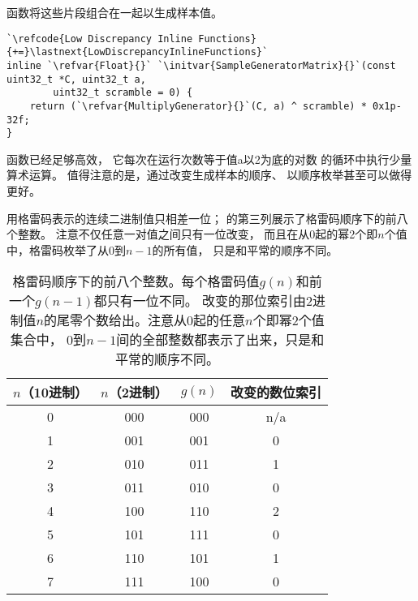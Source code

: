 函数将这些片段组合在一起以生成样本值。
\begin{lstlisting}
`\refcode{Low Discrepancy Inline Functions}{+=}\lastnext{LowDiscrepancyInlineFunctions}`
inline `\refvar{Float}{}` `\initvar{SampleGeneratorMatrix}{}`(const uint32_t *C, uint32_t a,
        uint32_t scramble = 0) {
    return (`\refvar{MultiplyGenerator}{}`(C, a) ^ scramble) * 0x1p-32f;
}
\end{lstlisting}

函数已经足够高效，
它每次在运行次数等于值{\ttfamily a}以2为底的对数
的循环中执行少量算术运算。
值得注意的是，通过改变生成样本的顺序、
以顺序枚举甚至可以做得更好。

用格雷码表示的连续二进制值只相差一位；
的第三列展示了格雷码顺序下的前八个整数。
注意不仅任意一对值之间只有一位改变，
而且在从0起的幂2个即$n$个值中，格雷码枚举了从0到$n-1$的所有值，
只是和平常的顺序不同。
\begin{table}[htbp]
    \centering
    \begin{tabular}{cccc}
        \toprule
        $n$\textbf{（10进制）} & $n$\textbf{（2进制）} & $g(n)$ & \textbf{改变的数位索引} \\
        \midrule
        0                      & 000                   & 000    & n/a                     \\
        1                      & 001                   & 001    & 0                       \\
        2                      & 010                   & 011    & 1                       \\
        3                      & 011                   & 010    & 0                       \\
        4                      & 100                   & 110    & 2                       \\
        5                      & 101                   & 111    & 0                       \\
        6                      & 110                   & 101    & 1                       \\
        7                      & 111                   & 100    & 0                       \\
        \bottomrule
    \end{tabular}
    \caption{格雷码顺序下的前八个整数。每个格雷码值$g(n)$和前一个$g(n-1)$都只有一位不同。
        改变的那位索引由2进制值$n$的尾零个数给出。注意从0起的任意$n$个即幂2个值集合中，
        0到$n-1$间的全部整数都表示了出来，只是和平常的顺序不同。}
    \label{tab:7.4}
\end{table}

